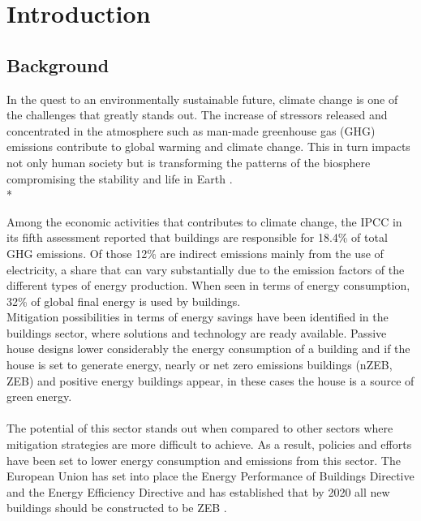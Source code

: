 \chapter{Introduction}

\section{Background}
In the quest to an environmentally sustainable future, climate change is one of the challenges that greatly stands out. The increase of stressors released and concentrated in the atmosphere such as man-made %
greenhouse gas (GHG) emissions contribute to global warming and climate change. This in turn impacts not only human society but is transforming the patterns of the biosphere compromising the stability and life in Earth \cite{someone}.\\* %

Among the economic activities that contributes to climate change, the IPCC in its fifth assessment \cite{IPCC2015} reported that buildings are responsible for 18.4\% of total GHG emissions. Of those 12\% are indirect emissions mainly from the use of electricity, a share that can vary substantially due to the emission factors of the different types of energy production. When seen in terms of energy consumption, 32\% of global final energy is used by buildings.\\

Mitigation possibilities in terms of energy savings have been identified in the buildings sector, where solutions and technology are ready available. Passive house designs lower considerably the energy consumption of a building and if the house is set to generate energy, nearly or net zero emissions buildings (nZEB, ZEB) and positive energy buildings appear, in these cases the house is a source of green energy.\\
\\

The potential of this sector stands out when compared to other sectors where mitigation strategies are more difficult to achieve. As a result, policies and efforts have been set to lower energy consumption and  emissions from this sector. The European Union has set into place the Energy Performance of Buildings Directive and the Energy Efficiency Directive and has established that by 2020 all new buildings should be constructed to be ZEB \cite{buildings directive}. \\

